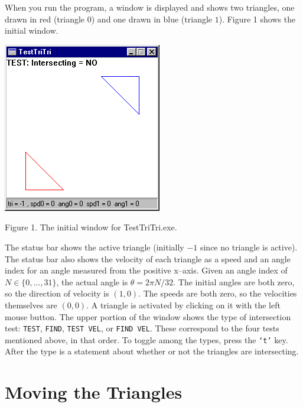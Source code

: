 \documentclass{article}
\newcommand{\Code}[1]{{\tt #1}}
\begin{document}
When you run the program, a window is displayed and shows two triangles, one
drawn in red (triangle $0$) and one drawn in blue (triangle $1$).  Figure 1
shows the initial window.
%
%
\begin{center}
  \includegraphics{Figure1.png}

  Figure 1.  The initial window for TestTriTri.exe.
\end{center}
%
The status bar shows the active triangle (initially $-1$ since no triangle is
active).  The status bar also shows the velocity of each triangle as a speed
and an angle index for an angle measured from the positive x--axis.  Given an
angle index of $N \in \{0,\ldots,31\}$, the actual angle is $\theta =
2\pi N/32$.  The initial angles are both zero, so the direction of velocity is
$(1,0)$.  The speeds are both zero, so the velocities themselves are $(0,0)$.
A triangle is activated by clicking on it with the left mouse button.  The
upper portion of the window shows the type of intersection test:  \Code{TEST},
\Code{FIND}, \Code{TEST VEL}, or \Code{FIND VEL}.  These correspond to the
four tests mentioned above, in that order.  To toggle among the types, press
the \Code{`t'} key.  After the type is a statement about whether or not the
triangles are intersecting.

\section{Moving the Triangles}
\end{document}
